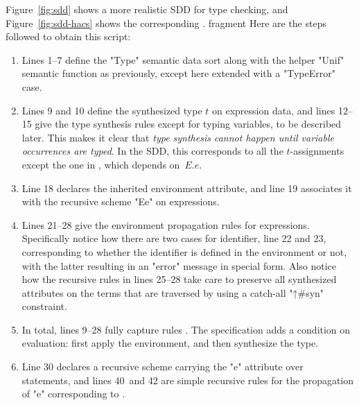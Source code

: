 \documentclass[11pt]{article} %
\begin{document}
\begin{example}
  Figure~\ref{fig:sdd} shows a more realistic SDD for type checking, and Figure~\ref{fig:sdd-hacs}
  shows the corresponding \HAX. fragment Here are the steps followed to obtain this script:
  \begin{enumerate}

  \item Lines 1--7 define the "Type" semantic data sort along with the helper "Unif" semantic
    function as previously, except here extended with a "TypeError" case.

  \item Lines 9 and 10 define the synthesized type $t$ on expression data, and lines 12--15 give the
    type synthesis rules except for typing variables, to be described later. This makes it clear
    that \emph{type synthesis cannot happen until variable occurrences are typed}. In the SDD, this
    corresponds to all the $t$-assignments except the one in , which depends on~$E.e$.

  \item Line 18 declares the inherited environment attribute, and line 19 associates it with the
    recursive scheme "Ee" on expressions.

  \item Lines 21--28 give the environment propagation rules for expressions. Specifically notice how
    there are two cases for identifier, line 22 and 23, corresponding to whether the identifier is
    defined in the environment or not, with the latter resulting in an "error" message in special
    \HAX form. Also notice how the recursive rules in lines 25--28 take care to preserve all
    synthesized attributes on the terms that are traversed by using a catch-all "↑#syn" constraint.

  \item In total, lines 9--28 fully capture rules . The \HAX specification adds a
    condition on evaluation: first apply the environment, and then synthesize the type.

  \item Line 30 declares a recursive scheme carrying the "e" attribute over statements, and lines
    40~and 42 are simple recursive rules for the propagation of "e" corresponding to
    .


\end{enumerate}
\end{example}
\end{document}

